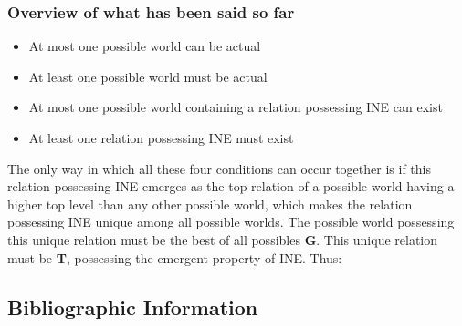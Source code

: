 \documentclass[11pt]{article}
\begin{document}
\subsubsection{Overview of what has been said so far}
\label{sec-1.5.1}

\begin{itemize}
\item At most one possible world can be actual
\item At least one possible world must be actual
\item At most one possible world containing a relation possessing INE can exist
\item At least one relation possessing INE must exist
\end{itemize}
The only way in which all these four conditions can occur together
is if this relation possessing INE emerges as the top relation of a
possible world having a higher top level than any other possible
world, which makes the relation possessing INE unique among all
possible worlds. The possible world possessing this unique relation
must be the best of all possibles \textbf{G}. This unique relation must
be \textbf{T}, possessing the emergent property of INE. Thus:


\subsection{Bibliographic Information}
\label{sec-1.6}
\end{document}
